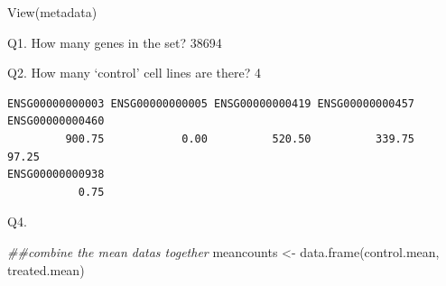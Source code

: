 \documentclass[
  letterpaper,
  DIV=11,
  numbers=noendperiod]{scrartcl}
\newenvironment{Shaded}{\begin{snugshade}}{\end{snugshade}}
\newcommand{\DecValTok}[1]{\textcolor[rgb]{0.68,0.00,0.00}{#1}}
\newcommand{\DocumentationTok}[1]{\textcolor[rgb]{0.37,0.37,0.37}{\textit{#1}}}
\newcommand{\FunctionTok}[1]{\textcolor[rgb]{0.28,0.35,0.67}{#1}}
\newcommand{\NormalTok}[1]{\textcolor[rgb]{0.00,0.23,0.31}{#1}}
\newcommand{\OtherTok}[1]{\textcolor[rgb]{0.00,0.23,0.31}{#1}}
\newcommand{\SpecialCharTok}[1]{\textcolor[rgb]{0.37,0.37,0.37}{#1}}
\newcommand{\StringTok}[1]{\textcolor[rgb]{0.13,0.47,0.30}{#1}}
\begin{document}
\begin{Shaded}
\begin{Highlighting}[]
\FunctionTok{View}\NormalTok{(metadata)}
\end{Highlighting}
\end{Shaded}

Q1. How many genes in the set? 38694

Q2. How many `control' cell lines are there? 4

\begin{Shaded}
\end{Shaded}

\begin{verbatim}
ENSG00000000003 ENSG00000000005 ENSG00000000419 ENSG00000000457 ENSG00000000460 
         900.75            0.00          520.50          339.75           97.25 
ENSG00000000938 
           0.75 
\end{verbatim}

Q4.

\begin{Shaded}
\end{Shaded}

\begin{Shaded}
\begin{Highlighting}[]
\DocumentationTok{\#\#combine the mean datas together}
\NormalTok{meancounts }\OtherTok{\textless{}{-}} \FunctionTok{data.frame}\NormalTok{(control.mean, treated.mean)}
\end{Highlighting}
\end{Shaded}
\end{document}
